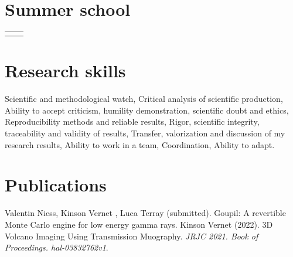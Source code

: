 \documentclass[
	10pt,
]{FreemanCV}
\begin{document}
\begin{paracol}{2}
\section{Summer school}

\begin{supertabular}{r l}
\end{supertabular}


\section{Research skills}

Scientific and methodological watch,
Critical analysis of scientific production,
Ability to accept criticism, humility demonstration, scientific doubt and ethics,
Reproducibility methods and reliable results,
Rigor, scientific integrity, traceability and validity of results,
Transfer, valorization and discussion of my research results,
Ability to work in a team,
Coordination,
Ability to adapt.


\section{Publications}
Valentin Niess, Kinson Vernet , Luca Terray (submitted). Goupil: A revertible Monte Carlo engine for low energy gamma rays.
\medskip
\newline
Kinson Vernet (2022). 3D Volcano Imaging Using Transmission Muography. \textit{JRJC 2021. Book of Proceedings. hal-03832762v1}.

\medskip

\end{paracol}
\end{document}
